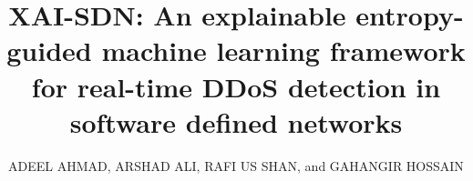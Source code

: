 \documentclass{ieeeaccess}
\begin{document}



\title{XAI-SDN: An explainable entropy-guided machine learning framework for real-time DDoS detection in software defined networks}

\author{\uppercase{Adeel Ahmad},
\uppercase{Arshad Ali}, \uppercase{Rafi us Shan}, and \uppercase{Gahangir Hossain}}

\address[1]{Faculty of Computer and Information Systems, Islamic University of Madinah, Al Madinah Al Munawarah, Saudi Arabia}
\address[2]{Faculty of Computer Information Science, Higher Colleges Of Technology, Al Mizn - Baniyas North - Abu Dhabi, United Arab Emirates}
\address[3]{Anuradha and Vikas Sinha Department of Data Science, University of North Texas, Denton, TX, USA, 76203-5017}

\end{document}
